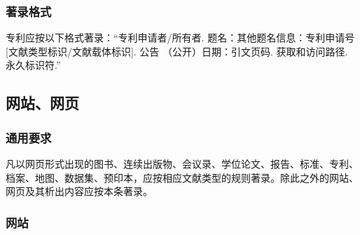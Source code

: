 \documentclass[twoside]{article}%
\begin{document}
\subsubsection{著录格式}

专利应按以下格式著录：“专利申请者/所有者. 题名：其他题名信息：专利申请号[文献类型标识/文献载体标识]. 公告
（公开）日期：引文页码. 获取和访问路径. 永久标识符.”




\subsection{网站、网页}\label{sec:entrytype:web}

\subsubsection{通用要求}

凡以网页形式出现的图书、连续出版物、会议录、学位论文、报告、标准、专利、档案、地图、数据集、预印本，应按相应文献类型的规则著录。除此之外的网站、网页及其析出内容应按本条著录。

\subsubsection{网站}
\end{document}
